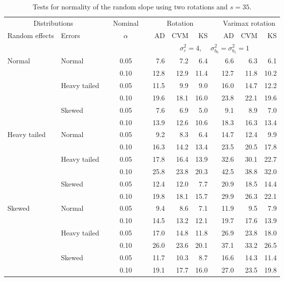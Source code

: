 \begin{table}[ht]
\caption{\label{tab:simb1s35-alt}Tests for normality of the random slope using two rotations and $s = 35$.}
\begin{scriptsize}
\begin{center}
\begin{tabular}{ll p{.1cm} c p{.1cm} rrr p{.1cm} rrr}
  \hline
  \multicolumn{2}{c}{Distributions}& & Nominal & &  \multicolumn{3}{c}{Rotation} & & \multicolumn{3}{c}{Varimax rotation} \\ \cline{1-2} \cline{6-8} \cline{10-12}   
  Random effects & Errors & & $\alpha$ & & AD & CVM & KS & & AD & CVM & KS \\ 
   \hline
& && && \multicolumn{7}{c}{$\sigma_{\varepsilon}^2 = 4$, \ \ $\sigma_{b_0}^2 = \sigma_{b_1}^2 = 1$} \\ \cline{6-12}
Normal       & Normal       && 0.05 &&   7.6 & 7.2 & 6.4 &   & 6.6 & 6.3 & 6.1 \\ 
             &              && 0.10 &&   12.8 & 12.9 & 11.4 &   & 12.7 & 11.8 & 10.2 \\ 
             & Heavy tailed && 0.05 &&   11.5 & 9.9 & 9.0 &   & 16.0 & 14.7 & 12.2 \\ 
             &              && 0.10 &&   19.6 & 18.1 & 16.0 &   & 23.8 & 22.1 & 19.6 \\ 
             & Skewed       && 0.05 &&   7.6 & 6.9 & 5.0 &   & 9.1 & 8.9 & 7.0 \\ 
             &              && 0.10 &&   13.9 & 12.6 & 10.6 &   & 18.3 & 16.3 & 13.4 \\ 
Heavy tailed & Normal       && 0.05 &&   9.2 & 8.3 & 6.4 &   & 14.7 & 12.4 & 9.9 \\ 
             &              && 0.10 &&   16.3 & 14.2 & 13.4 &   & 23.5 & 20.5 & 17.8 \\ 
             & Heavy tailed && 0.05 &&   17.8 & 16.4 & 13.9 &   & 32.6 & 30.1 & 22.7 \\ 
             &              && 0.10 &&   25.8 & 23.8 & 20.3 &   & 42.5 & 38.8 & 32.0 \\ 
             & Skewed       && 0.05 &&   12.4 & 12.0 & 7.7 &   & 20.9 & 18.5 & 14.4 \\ 
             &              && 0.10 &&   19.8 & 18.1 & 15.7 &   & 29.9 & 26.3 & 22.1 \\ 
Skewed       & Normal       && 0.05 &&   9.4 & 8.6 & 7.1 &   & 11.9 & 9.5 & 7.9 \\ 
             &              && 0.10 &&   14.5 & 13.2 & 12.1 &   & 19.7 & 17.6 & 13.9 \\ 
             & Heavy tailed && 0.05 &&   17.0 & 14.8 & 11.8 &   & 26.9 & 23.8 & 18.0 \\ 
             &              && 0.10 &&   26.0 & 23.6 & 20.1 &   & 37.1 & 33.2 & 26.5 \\ 
             & Skewed       && 0.05 &&   11.7 & 10.3 & 8.7 &   & 16.6 & 14.3 & 11.4 \\ 
             &              && 0.10 &&   19.1 & 17.7 & 16.0 &   & 27.0 & 23.5 & 19.8 \\ 


\end{tabular}
\end{center}
\end{scriptsize}
\end{table}
